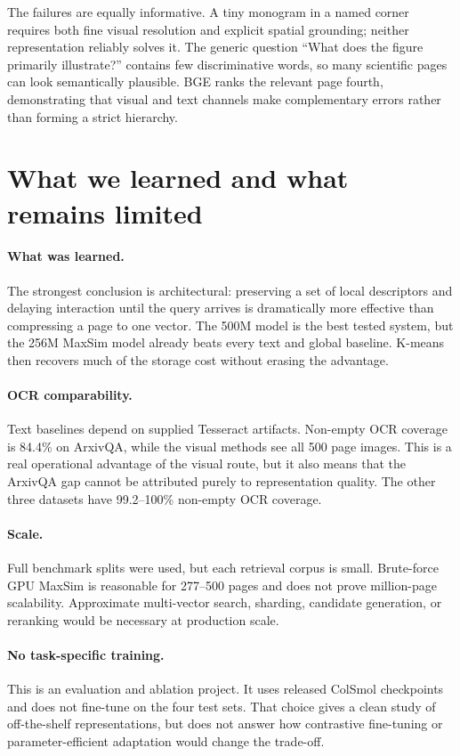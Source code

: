 \documentclass[11pt,a4paper]{article}
\begin{document}
The failures are equally informative. A tiny monogram in a named corner requires both fine visual resolution and explicit spatial grounding; neither representation reliably solves it. The generic question ``What does the figure primarily illustrate?'' contains few discriminative words, so many scientific pages can look semantically plausible. BGE ranks the relevant page fourth, demonstrating that visual and text channels make complementary errors rather than forming a strict hierarchy.

\section{What we learned and what remains limited}

\paragraph{What was learned.} The strongest conclusion is architectural: preserving a set of local descriptors and delaying interaction until the query arrives is dramatically more effective than compressing a page to one vector. The 500M model is the best tested system, but the 256M MaxSim model already beats every text and global baseline. K-means then recovers much of the storage cost without erasing the advantage.

\paragraph{OCR comparability.} Text baselines depend on supplied Tesseract artifacts. Non-empty OCR coverage is 84.4\% on ArxivQA, while the visual methods see all 500 page images. This is a real operational advantage of the visual route, but it also means that the ArxivQA gap cannot be attributed purely to representation quality. The other three datasets have 99.2--100\% non-empty OCR coverage.

\paragraph{Scale.} Full benchmark splits were used, but each retrieval corpus is small. Brute-force GPU MaxSim is reasonable for 277--500 pages and does not prove million-page scalability. Approximate multi-vector search, sharding, candidate generation, or reranking would be necessary at production scale.

\paragraph{No task-specific training.} This is an evaluation and ablation project. It uses released ColSmol checkpoints and does not fine-tune on the four test sets. That choice gives a clean study of off-the-shelf representations, but does not answer how contrastive fine-tuning or parameter-efficient adaptation would change the trade-off.
\end{document}
